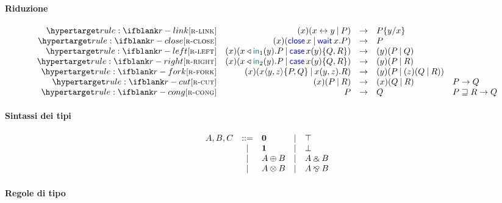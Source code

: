 \documentclass[a4paper]{article}
\begin{document}
\paragraph{Riduzione}

\[
    \begin{array}{rrcll}
        \defrule{r-link} &
        \Cut\x{\Link\x\y}{P} & \red & P\subst\y\x \\
        \defrule{r-close} &
        \Cut\x{\Close\x}{\Wait\x.P} & \red & P \\
        \defrule{r-left} &
        \Cut\x{\Left\x\y.P}{\Case\x\y{Q}{R}} & \red & \Cut\y{P}{Q} \\
        \defrule{r-right} &
        \Cut\x{\Right\x\y.P}{\Case\x\y{Q}{R}} & \red & \Cut\y{P}{R} \\
        \defrule{r-fork} &
        \Cut\x{\Fork\x\y\z{P}{Q}}{\Join\x\y\z.R} & \red & \Cut\y{P}{\Cut\z{Q}{R}} \\
        \defrule{r-cut} &
        \Cut\x{P}{R} & \red & \Cut\x{Q}{R} & P \red Q \\
        \defrule{r-cong} &
        P & \red & Q & P \pcong R \red Q \\
    \end{array}
\]

\paragraph{Sintassi dei tipi}

\[
    \begin{array}{rclcl}
        A, B, C & ::= & \mathbf{0} & | & \top \\
            & | & \mathbf{1} & | & \bot \\
            & | & A \mathbin\oplus B & | & A \mathbin\binampersand B \\
            & | & A \mathbin\otimes B & | & A \mathbin\bindnasrepma B \\
    \end{array}
\]

\paragraph{Regole di tipo}
\end{document}
